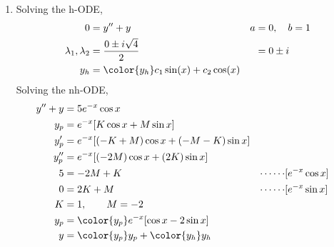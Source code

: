 \begin{enumerate}
    \item Solving the h-ODE,
          \begin{align}
              0                        & = y'' + y                                 & a & = 0, \quad b = 1 \\
              \lambda_{1}, \lambda_{2} & = \frac{0 \pm i\sqrt{4}}{2}               &   & = 0 \pm i        \\
              y_{h}                    & = \color{y_h} c_{1}\sin(x) + c_{2}\cos(x)
          \end{align}
          Solving the nh-ODE,
          \begin{align}
              y'' + y & = 5e^{-x}\cos x                                                             \\
              y_{p}   & = e^{-x}[K \cos x + M \sin x]                                               \\
              y_{p}'  & = e^{-x}[(-K + M) \cos x + (-M - K) \sin x]                                 \\
              y_{p}'' & = e^{-x}[(-2M) \cos x + (2K) \sin x]                                        \\
              5       & = -2M + K                                   & \cdots\cdots & [e^{-x}\cos x] \\
              0       & = 2K + M                                    & \cdots\cdots & [e^{-x}\sin x] \\
              K       & = 1, \qquad M = -2                                                          \\
              y_{p}   & = \color{y_p} e^{-x}[\cos x - 2\sin x]                                      \\
              y       & = {\color{y_p} y_{p}} + {\color{y_h} y_{h}}
          \end{align}


\end{enumerate}

